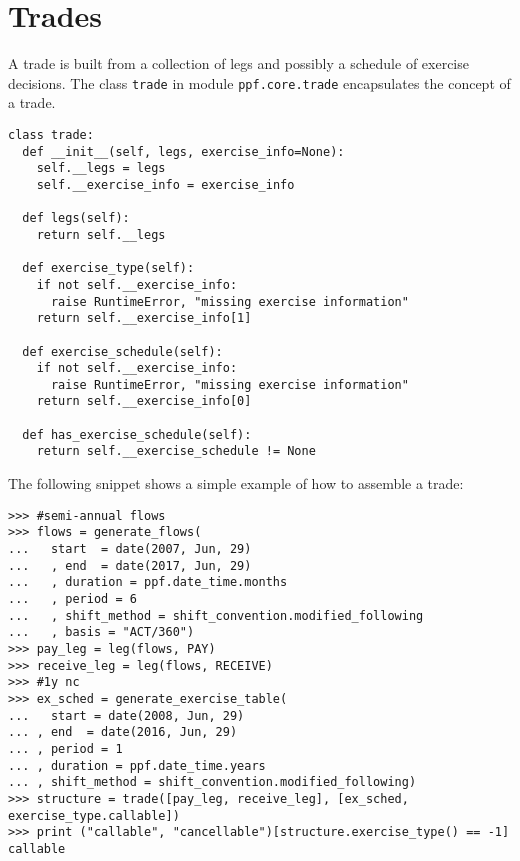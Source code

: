 \section{Trades}
A trade is built from a collection of legs and possibly a schedule of
exercise decisions. The class \verb|trade| in module
\verb|ppf.core.trade| encapsulates the concept of a trade.
\begin{verbatim}
class trade:
  def __init__(self, legs, exercise_info=None):
    self.__legs = legs
    self.__exercise_info = exercise_info

  def legs(self):
    return self.__legs

  def exercise_type(self):
    if not self.__exercise_info:
      raise RuntimeError, "missing exercise information"
    return self.__exercise_info[1]

  def exercise_schedule(self):
    if not self.__exercise_info:
      raise RuntimeError, "missing exercise information"
    return self.__exercise_info[0]

  def has_exercise_schedule(self):
    return self.__exercise_schedule != None

\end{verbatim}
The following snippet shows a simple example of how to assemble a trade:
\begin{verbatim}
>>> #semi-annual flows
>>> flows = generate_flows(
...   start  = date(2007, Jun, 29)
...   , end  = date(2017, Jun, 29)
...   , duration = ppf.date_time.months
...   , period = 6
...   , shift_method = shift_convention.modified_following
...   , basis = "ACT/360")
>>> pay_leg = leg(flows, PAY)
>>> receive_leg = leg(flows, RECEIVE)
>>> #1y nc
>>> ex_sched = generate_exercise_table(
...   start = date(2008, Jun, 29)
... , end  = date(2016, Jun, 29)
... , period = 1
... , duration = ppf.date_time.years
... , shift_method = shift_convention.modified_following)
>>> structure = trade([pay_leg, receive_leg], [ex_sched, exercise_type.callable])
>>> print ("callable", "cancellable")[structure.exercise_type() == -1]
callable
\end{verbatim}

